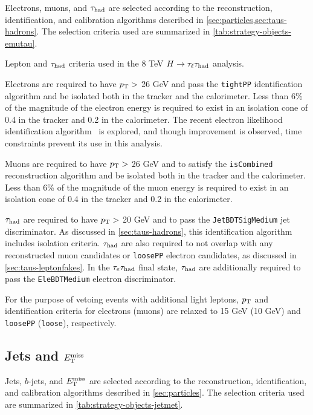 Electrons, muons, and $\tau_\text{had}$ are selected according to the reconstruction, identification, and calibration algorithms described in \cref{sec:particles,sec:taus-hadrons}. The selection criteria used are summarized in \cref{tab:strategy-objects-emutau}.

\begin{table}[bp]
  \centering
  \renewcommand{\arraystretch}{1.4}
  \caption{Lepton and $\tau_\text{had}$ criteria used in the 8 TeV $H\rightarrow\tau_\ell\tau_\text{had}$ analysis.}
  
  \label{tab:strategy-objects-emutau}
\end{table}

Electrons are required to have $p_{\mathrm{T}} >$ 26 GeV and pass the \texttt{tightPP} identification algorithm and be isolated both in the tracker and the calorimeter. Less than 6\% of the magnitude of the electron energy is required to exist in an isolation cone of 0.4 in the tracker and 0.2 in the calorimeter. The recent electron likelihood identification algorithm~\cite{ATLAS-CONF-2014-032} is explored, and though improvement is observed, time constraints prevent its use in this analysis.

Muons are required to have $p_{\mathrm{T}} >$ 26 GeV and to satisfy the \texttt{isCombined} reconstruction algorithm and be isolated both in the tracker and the calorimeter. Less than 6\% of the magnitude of the muon energy is required to exist in an isolation cone of 0.4 in the tracker and 0.2 in the calorimeter.

$\tau_\text{had}$ are required to have $p_{\mathrm{T}} >$ 20 GeV and to pass the \texttt{JetBDTSigMedium} jet discriminator. As discussed in \cref{sec:taus-hadrons}, this identification algorithm includes isolation criteria. $\tau_\text{had}$ are also required to not overlap with any reconstructed muon candidates or \texttt{loosePP} electron candidates, as discussed in \cref{sec:taus-leptonfakes}. In the $\tau_e \tau_\text{had}$ final state, $\tau_\text{had}$ are additionally required to pass the \texttt{EleBDTMedium} electron discriminator.

For the purpose of vetoing events with additional light leptons, $p_{\mathrm{T}}$ and identification criteria for electrons (muons) are relaxed to 15 GeV (10 GeV) and \texttt{loosePP} (\texttt{loose}), respectively.

\subsection{Jets and $E_{\mathrm{T}}^{\mathrm{miss}}$}
\label{sec:strategy-hadronic}

Jets, $b$-jets, and $E_{\mathrm{T}}^{\mathrm{miss}}$ are selected according to the reconstruction, identification, and calibration algorithms described in \cref{sec:particles}. The selection criteria used are summarized in \cref{tab:strategy-objects-jetmet}.


